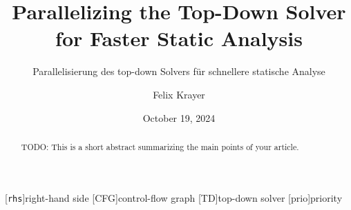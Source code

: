 \documentclass[
  english,        %
  font=times,     %
  twocolumn,      %
]{tumarticle}
\title{Parallelizing the Top-Down Solver for Faster Static Analysis}
\subtitle{Parallelisierung des top-down Solvers für schnellere statische Analyse}
\author[affil=1, email=felix.krayer@tum.de]{Felix Krayer}
\affil[mark=1]{\theUniversityName}
\date{October 19, 2024}
\begin{document}
\maketitle



\begin{abstract}
  TODO: This is a short abstract summarizing the main points of your article.
\end{abstract}









\begin{acronym}
  [\texttt{rhs}]{right-hand side}
  [CFG]{control-flow graph}
  [TD]{top-down solver}
  [prio]{priority}
\end{acronym}



\end{document}
